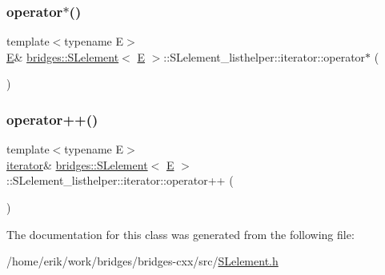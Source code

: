 \subsubsection{\texorpdfstring{operator$\ast$()}{operator*()}\hspace{0.1cm}{\footnotesize\ttfamily [2/2]}}
{\footnotesize\ttfamily template$<$typename E$>$ \\
\hyperlink{namespacebridges_acfb0a4f7877d8f63de3e6862004c50eda3a3ea00cfc35332cedf6e5e9a32e94da}{E}\& \hyperlink{classbridges_1_1_s_lelement}{bridges\+::\+S\+Lelement}$<$ \hyperlink{namespacebridges_acfb0a4f7877d8f63de3e6862004c50eda3a3ea00cfc35332cedf6e5e9a32e94da}{E} $>$\+::S\+Lelement\+\_\+listhelper\+::iterator\+::operator$\ast$ (\begin{DoxyParamCaption}{ }\end{DoxyParamCaption})\hspace{0.3cm}{\ttfamily [inline]}}

\mbox{\label{classbridges_1_1_s_lelement_1_1_s_lelement__listhelper_1_1iterator_acc2e5d9cba1b837897c0ff8d42618d3a}} 
\subsubsection{\texorpdfstring{operator++()}{operator++()}}
{\footnotesize\ttfamily template$<$typename E$>$ \\
\hyperlink{classbridges_1_1_s_lelement_1_1_s_lelement__listhelper_1_1iterator}{iterator}\& \hyperlink{classbridges_1_1_s_lelement}{bridges\+::\+S\+Lelement}$<$ \hyperlink{namespacebridges_acfb0a4f7877d8f63de3e6862004c50eda3a3ea00cfc35332cedf6e5e9a32e94da}{E} $>$\+::S\+Lelement\+\_\+listhelper\+::iterator\+::operator++ (\begin{DoxyParamCaption}{ }\end{DoxyParamCaption})\hspace{0.3cm}{\ttfamily [inline]}}



The documentation for this class was generated from the following file\+:\begin{DoxyCompactItemize}
\item 
/home/erik/work/bridges/bridges-\/cxx/src/\hyperlink{_s_lelement_8h}{S\+Lelement.\+h}\end{DoxyCompactItemize}
